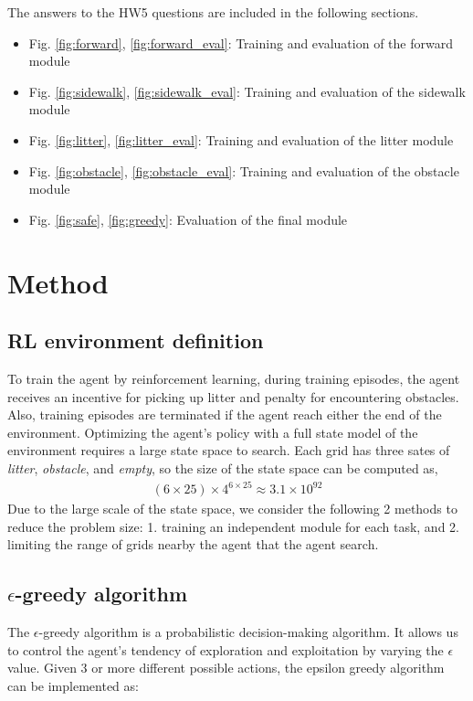 \documentclass[conference]{IEEEtran}
\begin{document}
The answers to the HW5 questions are included in the following sections.
\begin{itemize}
\item Fig. \ref{fig:forward}, \ref{fig:forward_eval}: Training and evaluation of the forward module
\item Fig. \ref{fig:sidewalk}, \ref{fig:sidewalk_eval}: Training and evaluation of the sidewalk module
\item Fig. \ref{fig:litter}, \ref{fig:litter_eval}: Training and evaluation of the litter module
\item Fig. \ref{fig:obstacle}, \ref{fig:obstacle_eval}: Training and evaluation of the obstacle module 
\item Fig. \ref{fig:safe}, \ref{fig:greedy}: Evaluation of the final module
\end{itemize}

\section{Method}
\label{sec:method}

\subsection{RL environment definition}
To train the agent by reinforcement learning, during training episodes, the agent receives an incentive for picking up litter and penalty for encountering obstacles.
Also, training episodes are terminated if the agent reach either the end of the environment.
Optimizing the agent's policy with a full state model of the environment requires a large state space to search.
Each grid has three sates of {\it litter}, {\it obstacle}, and {\it empty}, so the size of the state space can be computed as,
\begin{equation}
\begin{aligned}
(6 \times 25) \times 4^{6\times25}  \approx  3.1 \times 10 ^{92}
\end{aligned}
\end{equation}
Due to the large scale of the state space, we consider the following 2 methods to reduce the problem size: 1. training an independent module for each task, and 2. limiting the range of grids nearby the agent that the agent search.

\subsection{$\epsilon$-greedy algorithm}
The $\epsilon$-greedy algorithm is a probabilistic decision-making algorithm. 
It allows us to control the agent's tendency of exploration and exploitation by varying the $\epsilon$ value.
Given 3 or more different possible actions, the epsilon greedy algorithm can be implemented as:
\end{document}
